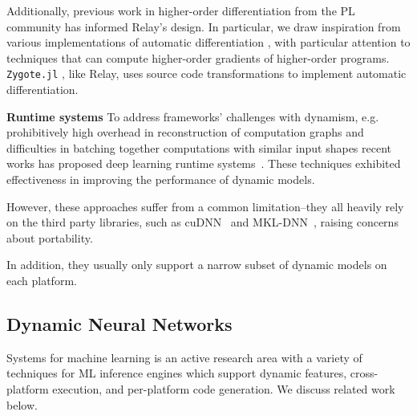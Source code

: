 Additionally, previous work in higher-order differentiation from the PL community
has informed Relay's design.
In particular, we draw inspiration from various implementations of
automatic differentiation \citep{beautiful_diff, ad_survey, haskell_ad, toplas_reverse, wang_reverse, DLS, DDF},
with particular attention to techniques that can compute higher-order gradients of higher-order programs.
\verb|Zygote.jl| \citep{zygotejl}, like Relay, uses source code transformations to
    implement automatic differentiation.



{\bf Runtime systems} To address frameworks' challenges with dynamism,
e.g. prohibitively high overhead in reconstruction of computation
graphs and difficulties in batching together computations with
similar input shapes recent works has proposed
deep learning runtime systems~\citep{xu2018cavs, gao2018low}.
These techniques exhibited effectiveness in improving the
performance of dynamic models.

However, these approaches suffer
from a common limitation--they all heavily rely on the third party libraries,
such as cuDNN~\citep{cudnn} and MKL-DNN~\citep{mkldnn},
raising concerns about portability.

In addition, they usually only support a narrow subset of dynamic models on each platform.


\subsection{Dynamic Neural Networks}


Systems for machine learning is an active research area with a variety of techniques for ML inference engines which support dynamic features, cross-platform execution, and per-platform code generation. We discuss related work below.

